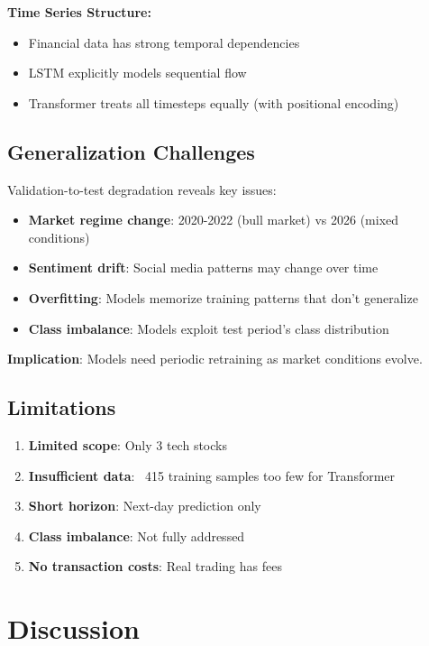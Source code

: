 \documentclass[10pt,twocolumn]{article}
\begin{document}
\textbf{Time Series Structure:}
\begin{itemize}
\item Financial data has strong temporal dependencies
\item LSTM explicitly models sequential flow
\item Transformer treats all timesteps equally (with positional encoding)
\end{itemize}

\subsection{Generalization Challenges}

Validation-to-test degradation reveals key issues:

\begin{itemize}
\item \textbf{Market regime change}: 2020-2022 (bull market) vs 2026 (mixed conditions)
\item \textbf{Sentiment drift}: Social media patterns may change over time
\item \textbf{Overfitting}: Models memorize training patterns that don't generalize
\item \textbf{Class imbalance}: Models exploit test period's class distribution
\end{itemize}

\textbf{Implication}: Models need periodic retraining as market conditions evolve.

\subsection{Limitations}

\begin{enumerate}
\item \textbf{Limited scope}: Only 3 tech stocks
\item \textbf{Insufficient data}: ~415 training samples too few for Transformer
\item \textbf{Short horizon}: Next-day prediction only
\item \textbf{Class imbalance}: Not fully addressed
\item \textbf{No transaction costs}: Real trading has fees
\end{enumerate}

\section{Discussion}
\end{document}
